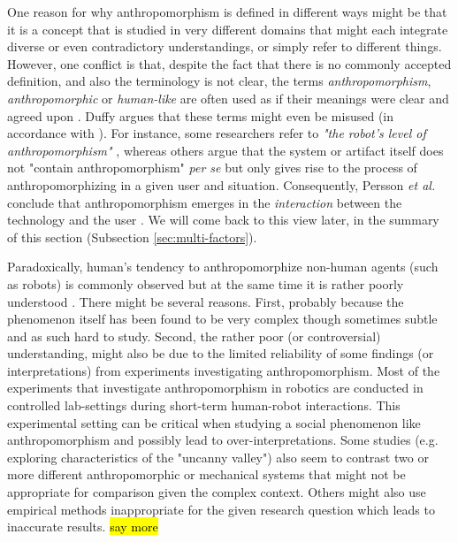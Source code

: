 \documentclass{frontiersSCNS} %
\begin{document}
One reason for why anthropomorphism is defined in different ways might be that it
is a concept that is studied in very different domains that might each
integrate diverse or even contradictory understandings, or simply refer to
different things.
However, one conflict is that, despite the fact that there is no commonly accepted
definition, and also the terminology is not clear, the terms
\textit{anthropomorphism}, \textit{anthropomorphic} or \textit{human-like} are
often used as if their meanings were clear and agreed upon
\cite{persson_anthropomorphism_2000}. Duffy \cite{duffy_anthropomorphism_2002}
argues that these terms might even be misused (in accordance with
\cite{epley_when_2008}). For instance, some researchers refer to \textit{"the
robot's level of anthropomorphism"} \cite{bartneck_is_2007}, whereas others
argue that the system or artifact itself does not "contain anthropomorphism"
\textit{per se} but only gives rise to the process of anthropomorphizing in a
given user and situation. Consequently, Persson \textit{et al.} conclude that
anthropomorphism emerges in the \textit{interaction} between the technology and
the user \cite{persson_anthropomorphism_2000}. We will come back to this view later, in the summary of this section (Subsection \ref{sec:multi-factors}). 

Paradoxically, human's tendency to anthropomorphize non-human agents (such as
robots) is commonly observed but at the same time it is rather poorly understood
\cite{epley_seeing_2007}. There might be several reasons. First, probably
because the phenomenon itself has been found to be very complex though sometimes
subtle and as such hard to study. Second, the rather poor (or controversial)
understanding, might also be due to the limited reliability of some findings (or
interpretations) from experiments investigating anthropomorphism. Most of the
experiments that investigate anthropomorphism in robotics are conducted in
controlled lab-settings during short-term human-robot interactions. This
experimental setting can be critical when studying a social phenomenon like
anthropomorphism and possibly lead to over-interpretations. Some studies (e.g.
exploring characteristics of the "uncanny valley") also seem to contrast two or
more different anthropomorphic or mechanical systems that might not be
appropriate for comparison given the complex context. Others might also use
empirical methods inappropriate for the given research question which leads to
inaccurate results. \hl{say more}
\end{document}

